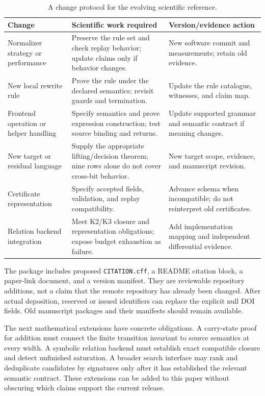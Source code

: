 \begin{table}[htbp]\small
\begin{tabularx}{\textwidth}{@{}>{\raggedright\arraybackslash}p{}>{\raggedright\arraybackslash}X>{\raggedright\arraybackslash}X@{}}
\toprule
Change & Scientific work required & Version/evidence action\\\midrule
Normalizer strategy or performance & Preserve the rule set and check replay behavior; update claims only if behavior changes. & New software commit and measurements; retain old evidence.\\
New local rewrite rule & Prove the rule under the declared semantics; revisit guards and termination. & Update the rule catalogue, witnesses, and claim map.\\
Frontend operation or helper handling & Specify semantics and prove expression construction; test source binding and returns. & Update supported grammar and semantic contract if meaning changes.\\
New target or residual language & Supply the appropriate lifting/decision theorem; nine rows alone do not cover cross-bit behavior. & New target scope, evidence, and manuscript revision.\\
Certificate representation & Specify accepted fields, validation, and replay compatibility. & Advance schema when incompatible; do not reinterpret old certificates.\\
Relation backend integration & Meet K2/K3 closure and representation obligations; expose budget exhaustion as failure. & Add implementation mapping and independent differential evidence.\\
\bottomrule
\end{tabularx}
\caption{A change protocol for the evolving scientific reference.}
\end{table}

The package includes proposed \texttt{CITATION.cff}, a README citation block, a paper-link document, and a version manifest. They are reviewable repository additions, not a claim that the remote repository has already been changed. After actual deposition, reserved or issued identifiers can replace the explicit null DOI fields. Old manuscript packages and their manifests should remain available.

The next mathematical extensions have concrete obligations. A carry-state proof for addition must connect the finite transition invariant to source semantics at every width. A symbolic relation backend must establish exact compatible closure and detect unfinished saturation. A broader search interface may rank and deduplicate candidates by signatures only after it has established the relevant semantic contract. These extensions can be added to this paper without obscuring which claims support the current release.
